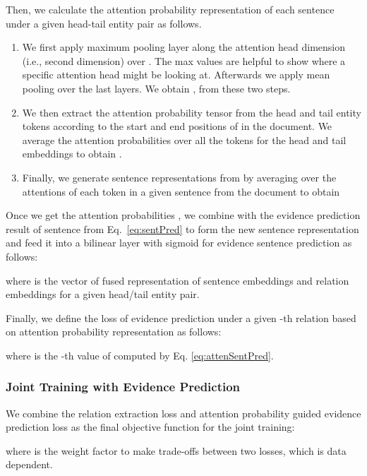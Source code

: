 \documentclass[11pt,a4paper]{article}
\begin{document}
Then, we calculate the attention probability representation of each sentence under a given head-tail entity pair as follows. 
\begin{enumerate}
    \item We first apply maximum pooling layer along the attention head dimension (i.e., second dimension) over . The max values are helpful to show where a specific attention head might be looking at. Afterwards we apply mean pooling over the last  layers. 
We obtain ,   from these two steps.
    
    \item We then extract the attention probability tensor from the head and tail entity tokens according to the start and end positions of in the document.
    We average the attention probabilities over all the tokens for the head and tail embeddings to obtain .

    \item Finally, we generate sentence representations from  by averaging over the attentions of each token in a given sentence from the document to obtain 



\end{enumerate}



Once we get the attention probabilities , we combine  with the evidence prediction result  of sentence  from Eq.~\ref{eq:sentPred} to form the new sentence representation and feed it into a bilinear layer with sigmoid for evidence sentence prediction as follows:

where  is the vector of fused representation of sentence embeddings and relation embeddings for a given head/tail entity pair.

Finally, we define the loss of evidence prediction under a given -th relation based on attention probability representation as follows: 

where  is the -th value of  computed by Eq. \ref{eq:attenSentPred}.

\subsubsection{Joint Training with Evidence Prediction}
We combine the relation extraction loss and attention probability guided evidence prediction loss as the final objective function for the joint training:

where  is the weight factor to make trade-offs between two losses, which is data dependent.
\end{document}
